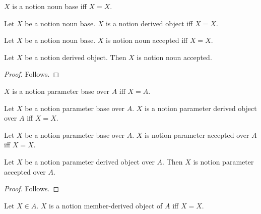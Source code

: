 \begin{definition}\label{notion_noun_base}
    $X$ is a notion noun base iff $X=X$.
\end{definition}

\begin{definition}\label{notion_derived_object}
    Let $X$ be a notion noun base.
    $X$ is a notion derived object iff $X=X$.
\end{definition}

\begin{definition}\label{notion_noun_accepted}
    Let $X$ be a notion noun base.
    $X$ is notion noun accepted iff $X=X$.
\end{definition}

\begin{proposition}\label{notion_noun_view_use}
    Let $X$ be a notion derived object.
    Then $X$ is notion noun accepted.
\end{proposition}
\begin{proof}
    Follows.
\end{proof}

\begin{definition}\label{notion_parameter_base}
    $X$ is a notion parameter base over $A$ iff $X=A$.
\end{definition}

\begin{definition}\label{notion_parameter_derived}
    Let $X$ be a notion parameter base over $A$.
    $X$ is a notion parameter derived object over $A$ iff $X=X$.
\end{definition}

\begin{definition}\label{notion_parameter_accepted}
    Let $X$ be a notion parameter base over $A$.
    $X$ is notion parameter accepted over $A$ iff $X=X$.
\end{definition}

\begin{proposition}\label{notion_parameter_view_use}
    Let $X$ be a notion parameter derived object over $A$.
    Then $X$ is notion parameter accepted over $A$.
\end{proposition}
\begin{proof}
    Follows.
\end{proof}

\begin{definition}\label{notion_member_derived}
    Let $X\in A$.
    $X$ is a notion member-derived object of $A$ iff $X=X$.
\end{definition}

